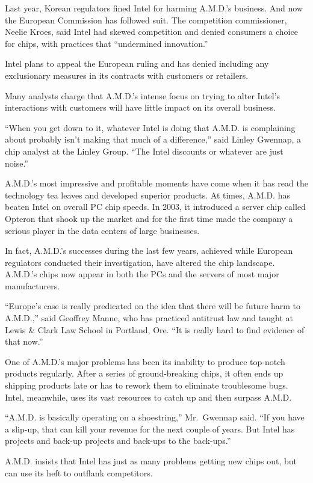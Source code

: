 \documentclass[12pt,a4paper,onecolumn]{article}
\begin{document}
Last year, Korean regulators fined Intel for harming A.M.D.'s business. And now the European
Commission has followed suit. The competition commissioner, Neelie Kroes, said Intel had skewed
competition and denied consumers a choice for chips, with practices that ``undermined innovation.''

Intel plans to appeal the European ruling and has denied including any exclusionary measures in its
contracts with customers or retailers.

Many analysts charge that A.M.D.'s intense focus on trying to alter Intel's interactions with
customers will have little impact on its overall business.

``When you get down to it, whatever Intel is doing that A.M.D. is complaining about probably isn't
making that much of a difference,'' said Linley Gwennap, a chip analyst at the Linley Group. ``The
Intel discounts or whatever are just noise.''

A.M.D.'s most impressive and profitable moments have come when it has read the technology tea leaves
and developed superior products. At times, A.M.D. has beaten Intel on overall PC chip speeds. In
2003, it introduced a server chip called Opteron that shook up the market and for the first time
made the company a serious player in the data centers of large businesses.

In fact, A.M.D.'s successes during the last few years, achieved while European regulators conducted
their investigation, have altered the chip landscape. A.M.D.'s chips now appear in both the PCs and
the servers of most major manufacturers.

``Europe's case is really predicated on the idea that there will be future harm to A.M.D.,'' said
Geoffrey Manne, who has practiced antitrust law and taught at Lewis \& Clark Law School in Portland,
Ore. ``It is really hard to find evidence of that now.''

One of A.M.D.'s major problems has been its inability to produce top-notch products regularly. After
a series of ground-breaking chips, it often ends up shipping products late or has to rework them to
eliminate troublesome bugs. Intel, meanwhile, uses its vast resources to catch up and then surpass
A.M.D.

``A.M.D. is basically operating on a shoestring,'' Mr.~Gwennap said. ``If you have a slip-up, that
can kill your revenue for the next couple of years. But Intel has projects and back-up projects and
back-ups to the back-ups.''

A.M.D. insists that Intel has just as many problems getting new chips out, but can use its heft to
outflank competitors.
\end{document}
